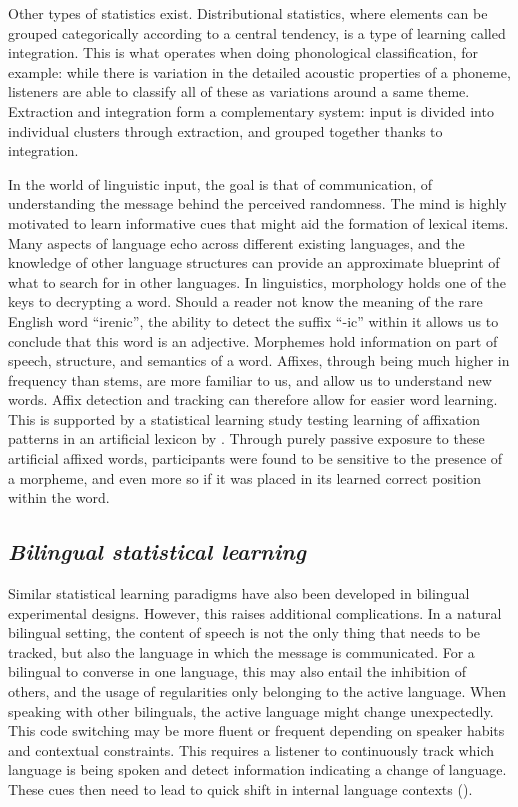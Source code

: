 Other types of statistics exist. Distributional statistics, where elements can be grouped categorically according to a central tendency, is a type of learning called integration. This is what operates when doing phonological classification, for example: while there is variation in the detailed acoustic properties of a phoneme, listeners are able to classify all of these as variations around a same theme. Extraction and integration form a complementary system: input is divided into individual clusters through extraction, and grouped together thanks to integration.  

In the world of linguistic input, the goal is that of communication, of understanding the message behind the perceived randomness. The mind is highly motivated to learn informative cues that might aid the formation of lexical items. Many aspects of language echo across different existing languages, and the knowledge of other language structures can provide an approximate blueprint of what to search for in other languages. In linguistics, morphology holds one of the keys to decrypting a word. Should a reader not know the meaning of the rare English word ``irenic'', the ability to detect the suffix ``-ic'' within it allows us to conclude that this word is an adjective. Morphemes hold information on part of speech, structure, and semantics of a word. Affixes, through being much higher in frequency than stems, are more familiar to us, and allow us to understand new words. Affix detection and tracking can therefore allow for easier word learning. This is supported by a statistical learning study testing learning of affixation patterns in an artificial lexicon by \textcite{Lelonkiewicz2020}. Through purely passive exposure to these artificial affixed words, participants were found to be sensitive to the presence of a morpheme, and even more so if it was placed in its learned correct position within the word.


\subsection{\large{\emph{Bilingual statistical learning}}}
\label{BiSL}
\noindent
Similar statistical learning paradigms have also been developed in bilingual experimental designs. However, this raises additional complications. In a natural bilingual setting, the content of speech is not the only thing that needs to be tracked, but also the language in which the message is communicated. For a bilingual to converse in one language, this may also entail the inhibition of others, and the usage of regularities only belonging to the active language. When speaking with other bilinguals, the active language might change unexpectedly. This code switching may be more fluent or frequent depending on speaker habits and contextual constraints. This requires a listener to continuously track which language is being spoken and detect information indicating a change of language. These cues then need to lead to quick shift in internal language contexts (\cite{Antovich2018}). 

